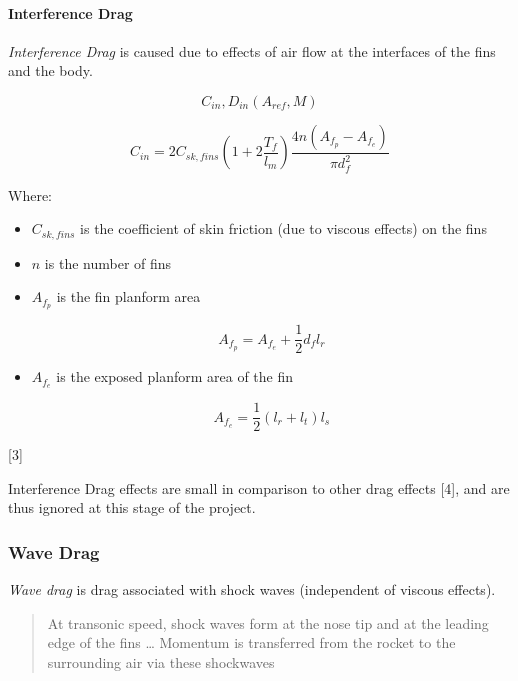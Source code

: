 \documentclass[]{article}
\providecommand{\tightlist}{%
  \setlength{\itemsep}{0pt}\setlength{\parskip}{0pt}}
\let\oldparagraph\paragraph
\renewcommand{\paragraph}[1]{\oldparagraph{#1}\mbox{}}
\begin{document}
\paragraph{Interference Drag}\label{interference-drag}

\emph{Interference Drag} is caused due to effects of air flow at the
interfaces of the fins and the body.

\begin{equation} 
C_{in}, D_{in} (A_{ref}, M) 
\end{equation}

\begin{equation}
\label{eq_interference_drag_coefficient}
C_{in} = 2 C_{sk,fins} \left( 1 + 2 \dfrac{T_f}{l_m} \right) \dfrac{4n(A_{f_p}-A_{f_e})} {\pi d^2_f}
\end{equation}

Where:

\begin{itemize}
\tightlist
\item
  \(C_{sk,fins}\) is the coefficient of skin friction (due to viscous
  effects) on the fins
\item
  \(n\) is the number of fins
\item
  \(A_{f_p}\) is the fin planform area

  \begin{equation}
  \label{eq_fin_planform_area}
  A_{f_p} = A_{f_e} + \dfrac{1}{2} d_f l_r
  \end{equation}
\item
  \(A_{f_e}\) is the exposed planform area of the fin

  \begin{equation}
  \label{eq_exposed_fin_planform_area}
  A_{f_e} = \dfrac{1}{2} (l_r + l_t) l_s 
  \end{equation}
\end{itemize}

{[}3{]}

Interference Drag effects are small in comparison to other drag effects
{[}4{]}, and are thus ignored at this stage of the project.

\subsubsection{Wave Drag}\label{wave-drag}

\emph{Wave drag} is drag associated with shock waves (independent of
viscous effects).

\begin{quote}
At transonic speed, shock waves form at the nose tip and at the leading
edge of the fins \ldots{} Momentum is transferred from the rocket to the
surrounding air via these shockwaves
\end{quote}
\end{document}
